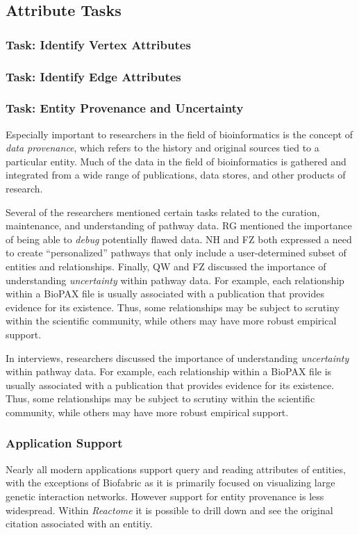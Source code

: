 \documentclass{egpubl}
\begin{document}

\subsection{Attribute Tasks}
\subsubsection{Task: Identify Vertex Attributes}
\subsubsection{Task: Identify Edge Attributes}
\subsubsection{Task: Entity Provenance and Uncertainty}

Especially important to researchers in the field of bioinformatics is the concept of \textit{data provenance}, which refers to the history and original sources tied to a particular entity. Much of the data in the field of bioinformatics is gathered and integrated from a wide range of publications, data stores, and other products of research.

Several of the researchers mentioned certain tasks related to the curation, maintenance, and understanding of pathway data. RG mentioned the importance of being able to \emph{debug} potentially flawed data. NH and FZ both expressed a need to create ``personalized'' pathways that only include a user-determined subset of entities and relationships. Finally, QW and FZ discussed the importance of understanding \emph{uncertainty} within pathway data. For example, each relationship within a BioPAX file is usually associated with a publication that provides evidence for its existence. Thus, some relationships may be subject to scrutiny within the scientific community, while others may have more robust empirical support.

In interviews, researchers discussed the importance of understanding \emph{uncertainty} within pathway data. For example, each relationship within a BioPAX file is usually associated with a publication that provides evidence for its existence. Thus, some relationships may be subject to scrutiny within the scientific community, while others may have more robust empirical support.


\subsubsection{Application Support} 
Nearly all modern applications support query and reading attributes of entities, with the exceptions of Biofabric as it is primarily focused on visualizing large genetic interaction networks.
However support for entity provenance is less widespread.
Within \textit{Reactome} it is possible to drill down and see the original citation associated with an entitiy.
\end{document}

